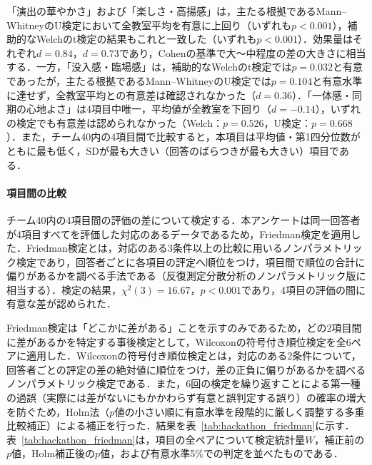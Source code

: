 「演出の華やかさ」および「楽しさ・高揚感」は，主たる根拠であるMann--WhitneyのU検定において全教室平均を有意に上回り（いずれも$p<0.001$），補助的なWelchのt検定の結果もこれと一致した（いずれも$p<0.001$）．効果量はそれぞれ$d=0.84$，$d=0.73$であり，Cohenの基準で大〜中程度の差の大きさに相当する．一方，「没入感・臨場感」は，補助的なWelchのt検定では$p=0.032$と有意であったが，主たる根拠であるMann--WhitneyのU検定では$p=0.104$と有意水準に達せず，全教室平均との有意差は確認されなかった（$d=0.36$）．「一体感・同期の心地よさ」は4項目中唯一，平均値が全教室を下回り（$d=-0.14$），いずれの検定でも有意差は認められなかった（Welch：$p=0.526$，U検定：$p=0.668$）．また，チーム40内の4項目間で比較すると，本項目は平均値・第1四分位数がともに最も低く，SDが最も大きい（回答のばらつきが最も大きい）項目である．

\paragraph{項目間の比較}

チーム40内の4項目間の評価の差について検定する．本アンケートは同一回答者が4項目すべてを評価した対応のあるデータであるため，Friedman検定を適用した．Friedman検定とは，対応のある3条件以上の比較に用いるノンパラメトリック検定であり，回答者ごとに各項目の評定へ順位をつけ，項目間で順位の合計に偏りがあるかを調べる手法である（反復測定分散分析のノンパラメトリック版に相当する）．検定の結果，$\chi^2(3)=16.67$，$p<0.001$であり，4項目の評価の間に有意な差が認められた．

Friedman検定は「どこかに差がある」ことを示すのみであるため，どの2項目間に差があるかを特定する事後検定として，Wilcoxonの符号付き順位検定を全6ペアに適用した．Wilcoxonの符号付き順位検定とは，対応のある2条件について，回答者ごとの評定の差の絶対値に順位をつけ，差の正負に偏りがあるかを調べるノンパラメトリック検定である．また，6回の検定を繰り返すことによる第一種の過誤（実際には差がないにもかかわらず有意と誤判定する誤り）の確率の増大を防ぐため，Holm法（$p$値の小さい順に有意水準を段階的に厳しく調整する多重比較補正）による補正を行った．結果を表~\ref{tab:hackathon_friedman}に示す．表~\ref{tab:hackathon_friedman}は，項目の全ペアについて検定統計量$W$，補正前の$p$値，Holm補正後の$p$値，および有意水準5\%での判定を並べたものである．

